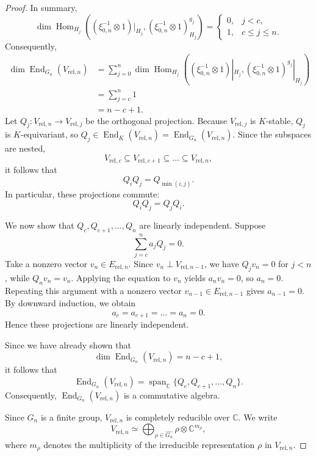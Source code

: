 \documentclass[11pt]{amsart}
\renewcommand{\rm}{\mathrm}
\theoremstyle{definition}
\numberwithin{equation}{section}
\begin{document}
\begin{proof}
        
		In summary,
		\[
		\dim \operatorname{Hom}_{H_j}((\xi_{0,n}^{-1} \otimes 1)|_{H_j}, (\xi_{0,n}^{-1} \otimes 1)^{g_j}_{H_j}) = 
		\begin{cases} 
			0, & j < c, \\
			1, & c \leq j \leq n.
		\end{cases}
		\]
		Consequently,
		\begin{align*}
			\dim \operatorname{End}_{G_n}(V_{\rm{rel},n}) &= \sum_{j=0}^n \dim \operatorname{Hom}_{H_j}((\xi_{0,n}^{-1} \otimes 1)|_{H_j}, (\xi_{0,n}^{-1} \otimes 1)^{g_j}|_{H_j}) \\
			&= \sum_{j=c}^n 1 \\
			&= n - c + 1.
		\end{align*}
		Let \(Q_j : V_{\rm{rel},n} \to V_{\rm{rel},j}\) be the orthogonal projection. Because \(V_{\rm{rel},j}\) is \(K\)-stable, \(Q_j\) is \(K\)-equivariant, so \(Q_j \in \operatorname{End}_K(V_{\rm{rel},n}) = \operatorname{End}_{G_n}(V_{\rm{rel},n})\). Since the subspaces are nested,
		\[
		V_{\rm{rel},c} \subseteq V_{\rm{rel},c+1} \subseteq \dots \subseteq V_{\rm{rel},n},
		\]
		it follows that
		\[
		Q_i Q_j = Q_{\min(i,j)}.
		\]
		In particular, these projections commute:
		\[
		Q_i Q_j = Q_j Q_i.
		\]
		
		We now show that \(Q_c, Q_{c+1}, \dots, Q_n\) are linearly independent. Suppose
		\[
		\sum_{j=c}^n a_j Q_j = 0.
		\]
		Take a nonzero vector \(v_n \in E_{\rm{rel},n}\). Since \(v_n \perp V_{\rm{rel},n-1}\), we have \(Q_j v_n = 0\) for \(j < n\), while \(Q_n v_n = v_n\). Applying the equation to \(v_n\) yields \(a_n v_n = 0\), so \(a_n = 0\). Repeating this argument with a nonzero vector \(v_{n-1} \in E_{\rm{rel},n-1}\) gives \(a_{n-1} = 0\). By downward induction, we obtain
		\[
		a_c = a_{c+1} = \dots = a_n = 0.
		\]
		Hence these projections are linearly independent.
		
		
		Since we have already shown that
		\[
		\dim \operatorname{End}_{G_n}(V_{\rm{rel},n}) = n - c + 1,
		\]
		it follows that
		\[
		\operatorname{End}_{G_n}(V_{\rm{rel},n}) = \operatorname{span}_{\mathbb{C}}\{Q_c, Q_{c+1}, \dots, Q_n\}.
		\]
		Consequently,
		\(
		\operatorname{End}_{G_n}(V_{\rm{rel},n})
		\)
		is a commutative algebra.
		
		
		Since \(G_n\) is a finite group, \(V_{\rm{rel},n}\) is completely reducible over \(\mathbb{C}\). We write
		\[
		V_{\rm{rel},n} \simeq \bigoplus_{\rho \in \widehat{G_n}} \rho \otimes \mathbb{C}^{m_\rho},
		\]
		where \(m_\rho\) denotes the multiplicity of the irreducible representation \(\rho\) in \(V_{\rm{rel},n}\).
		

\end{proof}
\end{document}
